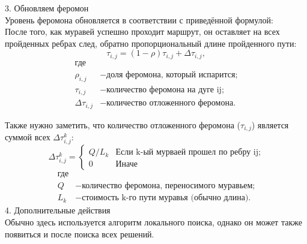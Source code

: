 \documentclass[12pt]{report}
\begin{document}
3. Обновляем феромон \\
  Уровень феромона обновляется в соответствии с приведённой формулой:\\
После того, как муравей успешно проходит маршрут, он оставляет на всех пройденных ребрах след, обратно пропорциональный длине пройденного пути:
\begin{equation}\label{form:eva} 
    \tau _{i,j}=(1-\rho )\tau _{i,j}+\Delta \tau _{i,j},
\end{equation}
\begin{align*}
    \text{где} \\
    \rho _{i,j} &- \text{доля феромона, который испарится;} \\
    \tau _{i,j} &- \text{количество феромона на дуге ij;} \\
    \Delta \tau _{i,j} &- \text{количество отложенного феромона.}
\end{align*}

Также нужно заметить, что количество отложенного феромона ($\tau _{i,j}$) является суммой всех $\Delta \tau _{i,j}^k$:\\

 \begin{equation}\label{form:add} 
    {\displaystyle \Delta \tau _{i,j}^k={\begin{cases}Q/L_{k}& {\mbox{Если k-ый мурваей прошел по ребру ij;}}\\0&{\mbox{Иначе}}\end{cases}}}
\end{equation}
\begin{align*}
    \text{где} \\
    Q &- \text{количество феромона, переносимого муравьем;} \\
    L_{k} &- \text{стоимость k-го пути муравья (обычно длина).}
\end{align*}
4. Дополнительные действия \\
 Обычно здесь используется алгоритм локального поиска, однако он может также появиться и после поиска всех решений. \\
 
\end{document}
